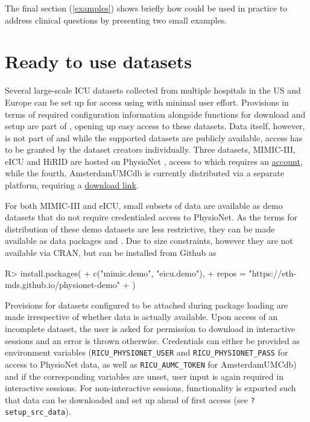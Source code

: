 \documentclass[
  notitle]{jss}
\begin{document}
The final section (\ref{examples}) shows briefly how  could be
used in practice to address clinical questions by presenting two small
examples.

\hypertarget{ready-to-use-datasets}{%
\section{Ready to use datasets}\label{ready-to-use-datasets}}

Several large-scale ICU datasets collected from multiple hospitals in
the US and Europe can be set up for access using  with minimal
user effort. Provisions in terms of required configuration information
alongside functions for download and setup are part of ,
opening up easy access to these datasets. Data itself, however, is not
part of  and while the supported datasets are publicly
available, access has to be granted by the dataset creators
individually. Three datasets, MIMIC-III, eICU and HiRID are hosted on
PhysioNet \citep{goldberger2000}, access to which requires an
\href{https://physionet.org/register/}{account}, while the fourth,
AmsterdamUMCdb is currently distributed via a separate platform,
requiring a
\href{https://amsterdammedicaldatascience.nl/\#amsterdamumcdb}{download
link}.

For both MIMIC-III and eICU, small subsets of data are available as demo
datasets that do not require credentialed access to PhysioNet. As the
terms for distribution of these demo datasets are less restrictive, they
can be made available as data packages  and
. Due to size constraints, however they are not available
via CRAN, but can be installed from Github as

\begin{CodeChunk}
\begin{CodeInput}
R> install.packages(
+   c("mimic.demo", "eicu.demo"),
+   repos = "https://eth-mds.github.io/physionet-demo"
+ )
\end{CodeInput}
\end{CodeChunk}

Provisions for datasets configured to be attached during package loading
are made irrespective of whether data is actually available. Upon access
of an incomplete dataset, the user is asked for permission to download
in interactive sessions and an error is thrown otherwise. Credentials
can either be provided as environment variables
(\texttt{RICU\_PHYSIONET\_USER} and \texttt{RICU\_PHYSIONET\_PASS} for
access to PhysioNet data, as well as \texttt{RICU\_AUMC\_TOKEN} for
AmsterdamUMCdb) and if the corresponding variables are unset, user input
is again required in interactive sessions. For non-interactive sessions,
functionality is exported such that data can be downloaded and set up
ahead of first access (see \texttt{?setup\_src\_data}).
\end{document}
